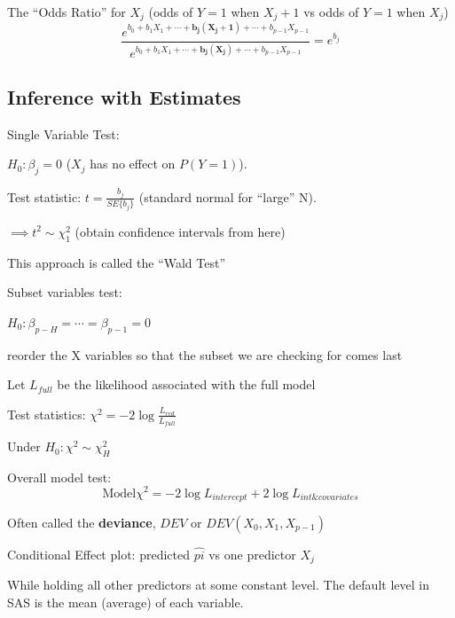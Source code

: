 \documentclass[12pt]{notes}
\begin{document}

\begin{minipage}[l][2cm][c]{\textwidth}

\end{minipage}

\bi
\item The ``Odds Ratio'' for $X_j$ (odds of $Y=1$ when $X_j + 1$ vs odds of $Y=1$ when $X_j$)
$$\frac{e^{b_0 + b_1X_1 + \cdots + \mathbf{b_j(X_j + 1)} + \cdots + b_{p-1}X_{p-1}}}{e^{b_0 + b_1X_1 + \cdots + \mathbf{b_j(X_j)} + \cdots + b_{p-1}X_{p-1}}} = e^{b_j}$$
\ei

\subsection{Inference with Estimates}
\bi
\item Single Variable Test:
\bi
\item $H_0: \beta_j = 0$ ($X_j$ has no effect on $P(Y=1)$). 
\item Test statistic: $t = \frac{b_j}{SE\{b_j\}}$ (standard normal for ``large'' N). 
\item $\implies t^2 \sim \chi^2_1$ (obtain confidence intervals from here)
\bi
\item This approach is called the ``Wald Test''
\ei
\ei
\item Subset variables test:
\bi
\item $H_0: \beta_{p-H} = \cdots = \beta_{p-1} = 0$
\bi
\item reorder the X variables so that the subset we are checking for comes last
\ei
\item Let $L_{full}$ be the likelihood associated with the full model
\item Test statistics: $\chi^2 = -2\log\frac{L_{red}}{L_{full}}$
\item Under $H_0: \chi^2 \sim \chi^2_H$
\ei
\item Overall model test:
$$\text{Model} \chi^2 = -2\log L_{intercept} + 2\log L_{int \& covariates}$$
\bi
\item Often called the \textbf{deviance}, $DEV$ or $DEV(X_0, X_1, X_{p-1})$
\ei
\item Conditional Effect plot: predicted $\hat{pi}$ vs one predictor $X_j$
\bi
\item While holding all other predictors at some constant level. The default level in SAS is the mean (average) of each variable. 
\ei
\ei
\end{document}
